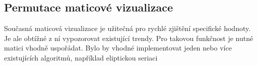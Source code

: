 \subsection*{Permutace maticové vizualizace}

Současná maticová vizualizace je užitečná pro rychlé zjištění specifické hodnoty. Je ale obtížné z ní vypozorovat existující trendy. Pro takovou funkčnost je nutné matici vhodně uspořádat\cite{chen2007handbook}. Bylo by vhodné implementovat jeden nebo více existujících algoritmů, například eliptickou seriaci\cite{chen2002generalized}